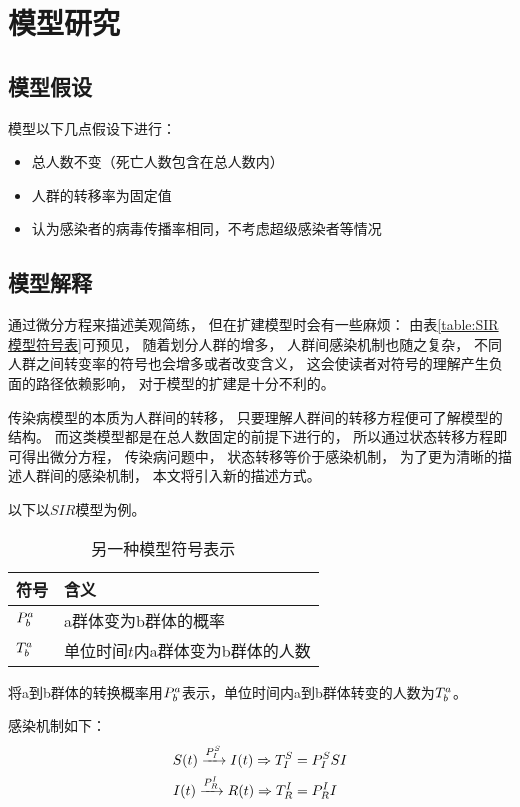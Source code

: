 \section{模型研究}
\subsection{模型假设}
\par 模型以下几点假设下进行：
\begin{itemize}
    \item 总人数不变（死亡人数包含在总人数内）
    \item 人群的转移率为固定值
    \item 认为感染者的病毒传播率相同，不考虑超级感染者等情况
\end{itemize}
\subsection{模型解释}
\par 通过微分方程来描述美观简练，
但在扩建模型时会有一些麻烦：
由表\ref{table:SIR模型符号表}可预见，
随着划分人群的增多，
人群间感染机制也随之复杂，
不同人群之间转变率的符号也会增多或者改变含义，
这会使读者对符号的理解产生负面的路径依赖影响，
对于模型的扩建是十分不利的。
\par 传染病模型的本质为人群间的转移，
只要理解人群间的转移方程便可了解模型的结构。
而这类模型都是在总人数固定的前提下进行的，
所以通过状态转移方程即可得出微分方程，
传染病问题中，
状态转移等价于感染机制，
为了更为清晰的描述人群间的感染机制，
本文将引入新的描述方式。
\par 以下以$SIR$模型为例。
\begin{table}[H]
    \centering
    \caption{另一种模型符号表示}
    \begin{tabular}{ll}
        \hline
        符号       & 含义                              \\
        \hline
        $\P{a}{b}$ & a群体变为b群体的概率              \\
        $\T{a}{b}$ & 单位时间$t$内a群体变为b群体的人数 \\
        \hline
    \end{tabular}
\end{table}
\par 将a到b群体的转换概率用$\P{a}{b}$表示，单位时间内a到b群体转变的人数为$\T{a}{b}$。
\par 感染机制如下：
\begin{align}
    S(t)\xrightarrow{\P{S}{I}}I(t) \Rightarrow \TP{S}{I}{SI} \\
    I(t)\xrightarrow{\P{I}{R}}R(t) \Rightarrow \TP{I}{R}{I}
\end{align}
